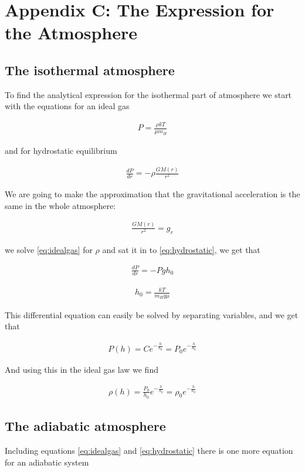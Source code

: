 \documentclass[a4paper, 10pt]{article}
\begin{document}
\section{Appendix C: The Expression for the Atmosphere}\label{sec:atmosphere}
\subsection{The isothermal atmosphere}
To find the analytical expression for the isothermal part of atmosphere we start with the equations for an ideal gas \cite{1e}

\begin{align}\label{eq:idealgas}
P = \frac{\rho kT}{\mu m_H}
\end{align}

and for hydrostatic equilibrium 

\begin{align}\label{eq:hydrostatic}
\frac{dP}{dr} = -\rho \frac{GM(r)}{r^2}
\end{align}

We are going to make the approximation that the gravitational acceleration is the same in the whole atmosphere:

\begin{align}
\frac{GM(r)}{r^2} = g_r
\end{align}

we solve \ref{eq:idealgas} for $\rho$ and sat it in to \ref{eq:hydrostatic}, we get that

\begin{align}
\frac{dP}{dr} = -Pg h_0
\end{align}

\begin{align}
h_0 = \frac{kT}{m_H g \mu}
\end{align}

This differential equation can easily be solved by separating variables, and we get that

\begin{align}
P(h) = C e^{-\frac{h}{h_0}} = P_0 e^{-\frac{h}{h_0}}
\end{align}

And using this in the ideal gas law we find

\begin{align}
\rho (h) = \frac{P_0}{h_0} e^{-\frac{h}{h_0}} = \rho_0 e^{-\frac{h}{h_0}}
\end{align}

\subsection{The adiabatic atmosphere}
Including equations \ref{eq:idealgas} and \ref{eq:hydrostatic} there is one more equation for an adiabatic system
\end{document}
